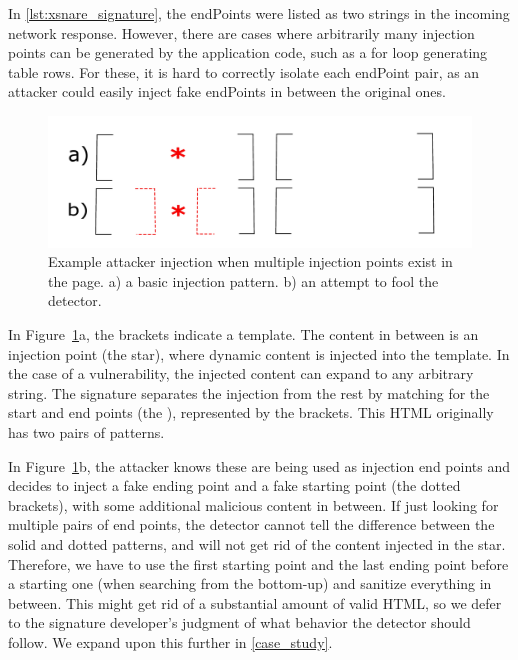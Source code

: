 In \autoref{lst:xsnare_signature}, the endPoints were listed as
two strings in the incoming network response. However, there are cases
where arbitrarily many injection points can be generated by the
application code, such as a for loop generating table rows. For these,
it is hard to correctly isolate each endPoint pair, as an attacker
could easily inject fake endPoints in between the original ones.

\begin{figure}[h]
	\begin{center}
	\includegraphics[scale=0.25]{img/attacker_injection_compound.pdf}
	\caption{Example attacker injection when multiple injection points exist in the page. a) a basic injection pattern. b) an attempt to fool the detector.}
	\label{fig:attacker_injection}
	\end{center}
\end{figure}

In Figure~\ref{fig:attacker_injection}a, the brackets indicate a
template. The content in between is an injection point (the star),
where dynamic content is injected into the template. In the case of a
vulnerability, the injected content can expand to any arbitrary
string. The signature separates the injection from the rest by
matching for the start and end points (the ),
represented by the brackets. This HTML originally has two pairs of
 patterns.

In Figure~\ref{fig:attacker_injection}b, the attacker knows these are
being used as injection end points and decides to inject a fake ending
point and a fake starting point (the dotted brackets), with some
additional malicious content in between. If just looking for multiple
pairs of end points, the detector cannot tell the difference between
the solid and dotted patterns, and will not get rid of the content
injected in the star. Therefore, we have to use the first starting
point and the last ending point before a starting one (when searching
from the bottom-up) and sanitize everything in between. This might get
rid of a substantial amount of valid HTML, so we defer to the
signature developer's judgment of what behavior the detector should
follow. We expand upon this further in \autoref{case_study}.


